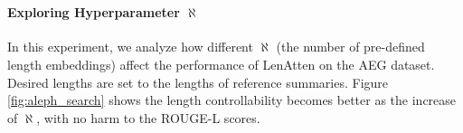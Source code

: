 \documentclass[11pt,a4paper]{article}
\begin{document}
\begin{table}[t]
  \centering 
  \small
  \\
  \small
  \caption{ROUGE scores and Length Variance $Var$ of \textsc{Paulus+LA2} under different desired lengths.}
  \label{tab:fl-results}
\end{table}

\paragraph{Exploring Hyperparameter $\aleph$}
\label{sec:aleph-explore}
In this experiment, we analyze how different $\aleph$ (the number of pre-defined length embeddings) affect the performance of LenAtten on the AEG dataset. Desired lengths are set to the lengths of reference summaries. Figure \ref{fig:aleph_search} shows the length controllability becomes better as the increase of $\aleph$, with no harm to the ROUGE-L scores. 

\end{document}
